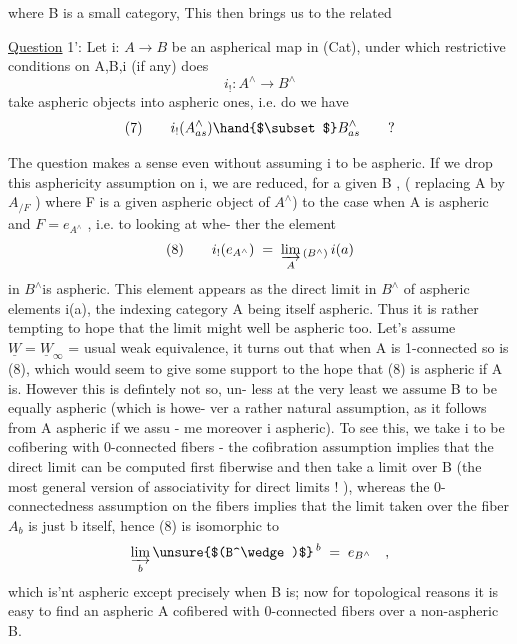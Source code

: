 
where B is a small category,  This then brings us to the related

\uline{Question} 1': Let i: $A\to B$ be an aspherical map in (Cat), under which
restrictive conditions on A,B,i (if any) does 
\[ i_! : A^\wedge\to B^\wedge \]
take aspheric objects into aspheric ones, i.e. do we have
\[ (7) \qquad i_!(A^\wedge_{as}) \hand{$\subset$} B^\wedge_{as} \qquad ? \]

The question makes a sense even without assuming i to be aspheric.
If we drop this asphericity assumption on i, we are reduced, for a given
B , ( replacing A by $A_{/F}$ ) where F is a given  aspheric object of
$A^\wedge$) to the case when A is aspheric and $F=e_{A^\wedge}$ , i.e. to looking at whe-%
ther the element
\[ (8) \qquad i_!(e_{A^\wedge}) \;=\; \varinjlim_{A}{}_{(B^\wedge)}\, i(a) \]
in $B^\wedge$\hand{/}is aspheric. This element appears as the direct limit in $B^\wedge$ of
aspheric elements i(a), the indexing category A being itself aspheric.
Thus it is rather tempting to hope that the limit might well be aspheric
too. Let's assume $\underline{W}=\underline{W}_\infty$ = usual weak equivalence, it turns out that when
A is 1-connected so is (8), which would seem to give some support to the
hope that (8) is aspheric if A is. However this is defintely not so, un-%
less at the very least we assume B to be equally aspheric (which is howe-%
ver a rather natural assumption, as it follows from A aspheric if we assu%
- me moreover i  aspheric). To see this, we take i to be cofibering with
0-connected fibers - the cofibration assumption implies that the direct
limit  can be computed first fiberwise and then take a limit over B
(the most general version of associativity for direct limits ! ), whereas
the 0-connectedness assumption on the fibers implies that the limit taken
over the fiber $A_b$ is just b itself, hence (8) is isomorphic to
\[ \varinjlim_{b}\unsure{$(B^\wedge)$}\,{}^{b} \;=\; e_{B^\wedge} \quad , \]
which is'nt aspheric except precisely when B is; now for topological
reasons it is easy to find an aspheric A cofibered with 0-connected fibers
over a non-aspheric B.

